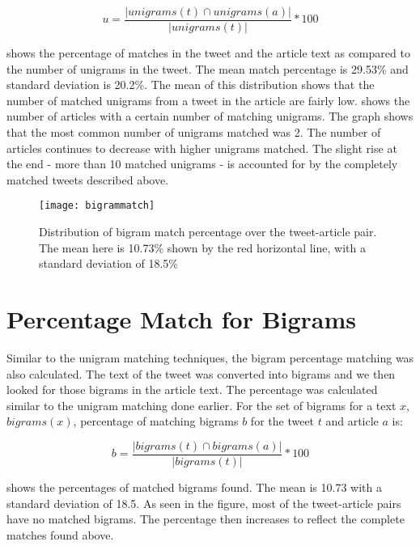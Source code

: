 \begin{equation}
u = \frac{| \textit{unigrams}(t) \cap \textit{unigrams}(a) |}{| \textit{unigrams}(t) |} * 100
\end{equation}

 shows the percentage of matches in the tweet and the article text as compared to the number of unigrams in the tweet. The mean match percentage is 29.53\% and standard deviation is 20.2\%. The mean of this distribution shows that the number of matched unigrams from a tweet in the article are fairly low.  shows the number of articles with a certain number of matching unigrams. The graph shows that the most common number of unigrams matched was 2. The number of articles continues to decrease with higher unigrams matched. The slight rise at the end - more than 10 matched unigrams - is accounted for by the completely matched tweets described above.

\begin{figure}[!htbp]
\centering
\texttt{[image: bigrammatch]}
\caption[Bigram match percentages]{Distribution of bigram match percentage over the tweet-article pair. The mean here is 10.73\% shown by the red horizontal line, with a standard deviation of 18.5\%}
\label{fig:bigrammatch}
\end{figure}


\section{Percentage Match for Bigrams}
\label{sec:bigrams}

Similar to the unigram matching techniques, the bigram percentage matching was also calculated. The text of the tweet was converted into bigrams and we then looked for those bigrams in the article text. The percentage was calculated similar to the unigram matching done earlier. For the set of bigrams for a text $x$, $\textit{bigrams}(x)$, percentage of matching bigrams $b$ for the tweet $t$ and article $a$ is: 

\begin{equation}
b = \frac{| \textit{bigrams}(t) \cap \textit{bigrams}(a) |}{| \textit{bigrams}(t) |} * 100
\end{equation}

 shows the percentages of matched bigrams found. The mean is 10.73 with a standard deviation of 18.5. As seen in the figure, most of the tweet-article pairs have no matched bigrams. The percentage then increases to reflect the complete matches found above.

